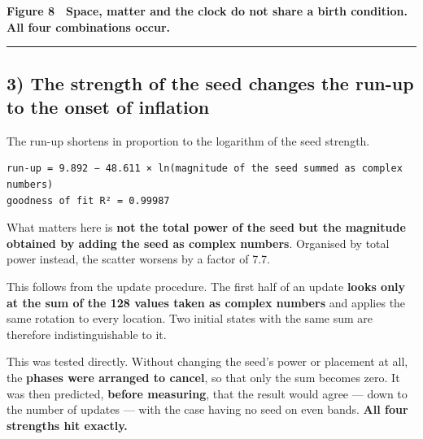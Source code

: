 \documentclass[
]{article}
\begin{document}
\textbf{Figure 8　Space, matter and the clock do not share a birth
condition. All four combinations occur.}

\begin{center}\rule{0.5\linewidth}{0.5pt}\end{center}

\subsection{3) The strength of the seed changes the run-up to the onset
of
inflation}\label{the-strength-of-the-seed-changes-the-run-up-to-the-onset-of-inflation}

The run-up shortens in proportion to the logarithm of the seed strength.

\begin{verbatim}
run-up = 9.892 − 48.611 × ln(magnitude of the seed summed as complex numbers)
goodness of fit R² = 0.99987
\end{verbatim}

What matters here is \textbf{not the total power of the seed but the
magnitude obtained by adding the seed as complex numbers}. Organised by
total power instead, the scatter worsens by a factor of 7.7.

This follows from the update procedure. The first half of an update
\textbf{looks only at the sum of the 128 values taken as complex
numbers} and applies the same rotation to every location. Two initial
states with the same sum are therefore indistinguishable to it.

This was tested directly. Without changing the seed's power or placement
at all, the \textbf{phases were arranged to cancel}, so that only the
sum becomes zero. It was then predicted, \textbf{before measuring}, that
the result would agree --- down to the number of updates --- with the
case having no seed on even bands. \textbf{All four strengths hit
exactly.}
\end{document}
